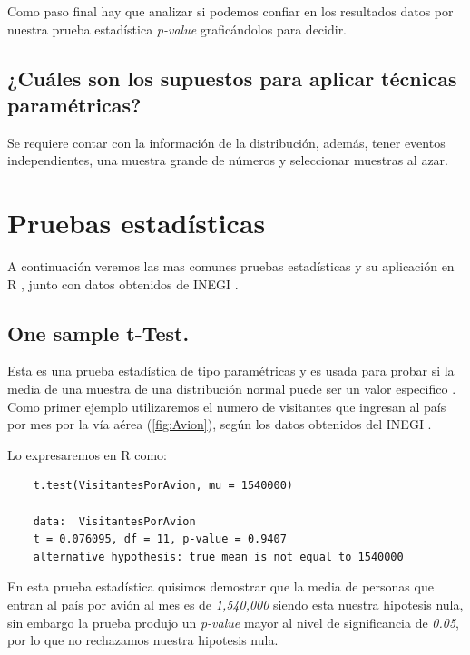 \documentclass[]{article}
\begin{document}
Como paso final hay que analizar si podemos confiar en los resultados datos por nuestra prueba estadística \textit{p-value} graficándolos para decidir.
\subsection{¿Cuáles son los supuestos para aplicar técnicas paramétricas?}
Se requiere contar con la información de la distribución, además, tener eventos independientes, una muestra grande de números y seleccionar muestras al azar.

\section{Pruebas estadísticas}
A continuación veremos las mas comunes pruebas estadísticas \cite{Articulo_0} y su aplicación en R         \cite{rproject}, junto con datos obtenidos de INEGI \cite{inegi}.
\subsection{One sample t-Test.}
Esta es una prueba estadística de tipo paramétricas y es usada para probar si la media de una muestra de una distribución normal puede ser un valor especifico \cite{Articulo_0}.
Como primer ejemplo utilizaremos el numero de visitantes que ingresan al país por mes por la vía aérea (\autoref{fig:Avion}), según los datos obtenidos del INEGI \cite{inegi}.

Lo expresaremos en R como:
  \begin{lstlisting}
	t.test(VisitantesPorAvion, mu = 1540000)
	
	data:  VisitantesPorAvion
	t = 0.076095, df = 11, p-value = 0.9407
	alternative hypothesis: true mean is not equal to 1540000
   \end{lstlisting}
   
   En esta prueba estadística quisimos demostrar que la media de personas que entran al país por avión al mes es de \textit{1,540,000} siendo esta nuestra hipotesis nula, sin embargo la prueba produjo un \textit{p-value} mayor al nivel de significancia de \textit{0.05}, por lo que no rechazamos nuestra hipotesis nula.
\end{document}
